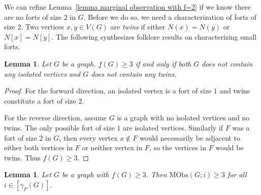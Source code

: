 \documentclass{article}
\newtheorem{lemma}[theorem]{Lemma}
\begin{document}
        We can refine Lemma~\ref{lemma marginal observation with f=2} if we know there are no forts of size $2$ in $G$.
        Before we do so, we need a characterization of forts of size $2$.
        Two vertices $x,y\in V(G)$ are \emph{twins} if either $N(x)=N(y)$ or $N[x]=N[y]$.
        The following synthesizes folklore results on characterizing small forts.        \begin{lemma}\label{lemma fort size 3 characterization}
            Let $G$ be a graph.
            $\underline{f}(G)\geq 3$ if and only if both $G$ does not contain any isolated vertices and $G$ does not contain any twins.
        \end{lemma}
        \begin{proof}
            For the forward direction, an isolated vertex is a fort of size $1$ and twins constitute a fort of size $2$.
        
            For the reverse direction, assume $G$ is a graph with no isolated vertices and no twins.
            The only possible fort of size $1$ are isolated vertices.
            Similarly if $F$ was a fort of size $2$ in $G$, then every vertex $x\not\in F$ would necessarily be adjacent to either both vertices in $F$ or neither vertex in $F$, so the vertices in $F$ would be twins.
            Thus $\underline{f}(G)\geq 3$.
        \end{proof}
        \begin{lemma}\label{lemma marginal obs with f geq 3}
            Let $G$ be a graph with $\underline{f}(G)\geq 3$. Then $ \mathrm{MObs}(G;i)\geq 3$ for all $i\in [\gamma_P(G)]$.
        \end{lemma}
\end{document}
